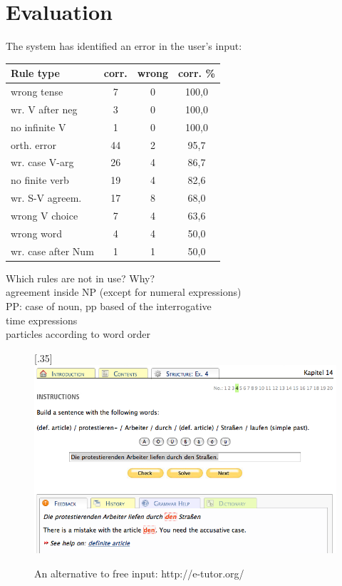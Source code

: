 \documentclass[11pt]{article}
\begin{document}
\section{Evaluation}
 
The system has identified an error in the user's input:
\begin{table}
\begin{tabular}{|l|c|c|c|}
\hline 
\textbf{Rule type}  & \textbf{corr.} & \textbf{wrong}   & \textbf{corr. \% }  \\
\hline 
wrong tense         & 7     & 0     & 100,0     \\ 
wr. V after neg   & 3     & 0     & 100,0     \\ 
no infinite V       & 1     & 0     & 100,0     \\ 
\hline 
orth. error         & 44    & 2     & 95,7      \\
wr. case V-arg  & 26    & 4     & 86,7      \\
no finite verb        & 19    & 4     &  82,6 \\
\hline 
wr. S-V agreem.   & 17    & 8     & 68,0 \\
wrong V choice        & 7     & 4     & 63,6 \\
\hline 
wrong word            & 4     & 4     & 50,0 \\
wr. case after Num  & 1     & 1     & 50,0 \\
\hline
\end{tabular}
\end{table}


Which rules are not in use? Why? \\
agreement inside NP (except for numeral expressions) \\
PP: case of noun, pp based of the interrogative  \\
time expressions \\
particles according to word order \\

\begin{figure}%
\begin{center}
\scalebox{.35}[.35]{\includegraphics{presentation/img/e-tutor.png}}\\
\caption{An alternative to free input: http://e-tutor.org/}
\end{center}
\end{figure}
 
\end{document}

